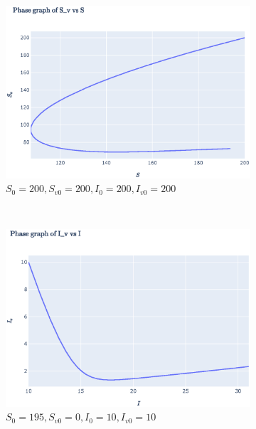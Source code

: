 \documentclass[11pt]{article}
\begin{document}
\begin{figure}[th]
\begin{subfigure}{0.49\textwidth}
	\end{subfigure}
	\begin{subfigure}{0.49\textwidth}
	  \centering
	  \includegraphics[width=\linewidth]{../figures/ex2_SvS_1.eps}  
	  \caption{$S_0 = 200, S_{v0} = 200,I_0 = 200, I_{v0} = 200$}
	\end{subfigure}\\
	\begin{subfigure}{0.49\textwidth}
	  \centering
	  \includegraphics[width=\linewidth]{../figures/ex2_IvI_2.eps}  
	   \caption{$S_0 = 195, S_{v0} = 0,I_0 = 10, I_{v0} = 10$}
	\end{subfigure}
	\begin{subfigure}{0.49\textwidth}
	  \centering

\end{subfigure}
\end{figure}
\end{document}
